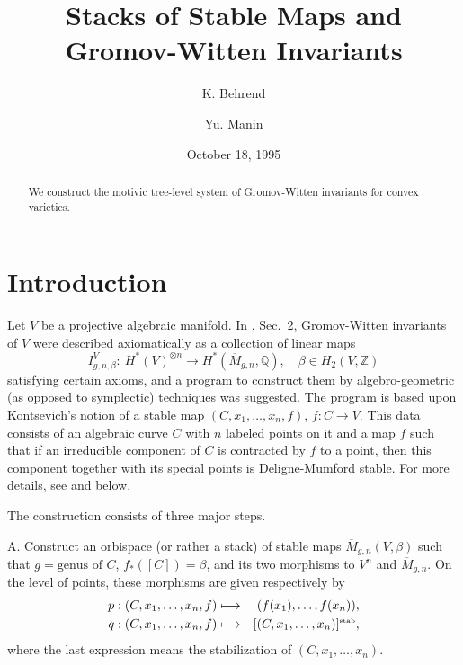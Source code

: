 \documentclass[11pt]{amsart}
\title{Stacks of Stable Maps and Gromov-Witten Invariants}
\date{October 18, 1995}
\author{K. Behrend}
\author{Yu. Manin}
\theoremstyle{definition}
\theoremstyle{remark}
\newcommand{\stab}{\mbox{\tiny stab}}
\newcommand{\upst}{^{\ast}}
\newcommand{\lst}{_{\ast}}
\newcommand{\zz}{{\mathbb{Z}}}
\newcommand{\qq}{{\mathbb{Q}}}
\newcommand{\ol}{\overline}
\newcommand{\red}[1]{\textcolor{red}{#1}}
\theoremstyle{plain}
\theoremstyle{definition}
\newtheorem*{Qn}{Question}
\theoremstyle{remark}
\newcounter{passage}
\newcommand{\passagemark}{%
  \refstepcounter{passage}%
  \textsuperscript{\normalfont[\thepassage]}%
}
\begin{document}
\begin{abstract}
We construct the motivic tree-level system of Gromov-Witten invariants
for convex varieties.
\end{abstract}
\maketitle

\setcounter{section}{-1}
\section{Introduction}


Let \(V\) be a projective algebraic manifold. In \cite{KM}, Sec.\ 2,
Gromov-Witten invariants of \(V\) were described
axiomatically as a collection of linear maps
\[
I^{V}_{g,n,\beta}:\ H\upst(V)^{\otimes n}\longrightarrow
H\upst(\ol{M}_{g,n},\qq),\quad \beta\in H_2(V,\zz)
\]
satisfying certain axioms, and a program to construct them by algebro-geometric
(as opposed to symplectic) techniques
was suggested. The program is based upon Kontsevich's notion of a stable map
\((C,x_1,\dots ,x_n,f)\), \(f:C\rightarrow V\).
This data consists of an algebraic curve \(C\) with \(n\) labeled points on it and
a map \(f\) such that if an irreducible
component of \(C\) is contracted by \(f\) to a point, then this component together
with its special points is
Deligne-Mumford stable.  For more details, see \cite{K} and below.

\smallskip

The construction consists of three major steps.

\medskip

A. Construct an orbispace (or rather a stack) of stable maps
\(\ol{M}_{g,n}(V,\beta)\) such that \(g=\text{genus of }C\),
\(f\lst{([C])}=\beta\), and its two morphisms to \(V^n\) and \(\ol{M}_{g,n}\). On the
level of points, these morphisms are
given respectively by
\begin{eqnarray*}
p:(C,x_1,\dots ,x_n,f) & \longmapsto & (f(x_1),\dots ,f(x_n)), \\
q:(C,x_1,\dots ,x_n,f) & \longmapsto & [(C,x_1,\dots ,x_n)]^{\stab},
\end{eqnarray*}
where the last expression means the  stabilization of \((C,x_1,\dots ,x_n)\).
\end{document}
